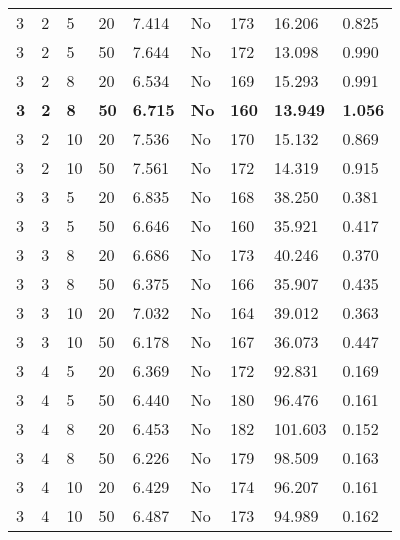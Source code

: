 \begin{longtable}{x{1.5cm} x{1.8cm} x{1.8cm} x{1.5cm} x{1.8cm} x{1.5cm} x{1.5cm} x{1.5cm} x{1.8cm}}
	3 & 2 & 5 & 20 & 7.414 & No & 173 & 16.206 & 0.825 \\
	3 & 2 & 5 & 50 & 7.644 & No & 172 & 13.098 & 0.990 \\
	3 & 2 & 8 & 20 & 6.534 & No & 169 & 15.293 & 0.991  \\
	\textbf{3} & \textbf{2} & \textbf{8} & \textbf{50} & \textbf{6.715} & \textbf{No} & \textbf{160} & \textbf{13.949} & \textbf{1.056} \\
	3 & 2 & 10 & 20 & 7.536 & No & 170 & 15.132 & 0.869 \\
	3 & 2 & 10 & 50 & 7.561 & No & 172 & 14.319 & 0.915 \\
	3 & 3 & 5 & 20 & 6.835 & No & 168 & 38.250 & 0.381 \\
	3 & 3 & 5 & 50 & 6.646 & No & 160 & 35.921 & 0.417 \\
	3 & 3 & 8 & 20 & 6.686 & No & 173 & 40.246 & 0.370 \\
	3 & 3 & 8 & 50 & 6.375 & No & 166 & 35.907 & 0.435 \\
	3 & 3 & 10 & 20 & 7.032 & No & 164 & 39.012 & 0.363 \\
	3 & 3 & 10 & 50 & 6.178 & No & 167 & 36.073 & 0.447 \\
	3 & 4 & 5 & 20 & 6.369 & No & 172 & 92.831 & 0.169 \\
	3 & 4 & 5 & 50 & 6.440 & No & 180 & 96.476 & 0.161 \\
	3 & 4 & 8 & 20 & 6.453 & No & 182 & 101.603 & 0.152 \\
	3 & 4 & 8 & 50 & 6.226 & No & 179 & 98.509 & 0.163 \\
	3 & 4 & 10 & 20 & 6.429 & No & 174 & 96.207 & 0.161  \\
	3 & 4 & 10 & 50 & 6.487 & No & 173 & 94.989 & 0.162 \\
	

\end{longtable}
